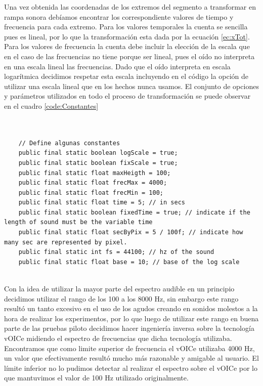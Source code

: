 \documentclass{article}
\begin{document}
    Una vez obtenida las coordenadas de los extremos del segmento a transformar en rampa sonora debíamos encontrar los correspondiente valores de tiempo y frecuencia para cada extremo. Para los valores temporales la cuenta se sencilla pues es lineal, por lo que la transformación esta dada por la ecuación \ref{ec:xTot}. Para los valores de frecuencia la cuenta debe incluir la elección de la escala que en el caso de las frecuencias no tiene porque ser lineal, pues el oído no interpreta en una escala lineal las frecuencias. Dado que el oído interpreta en escala logarítmica decidimos respetar esta escala incluyendo en el código la opción de utilizar una escala lineal que en los hechos nunca usamos. El conjunto de opciones y parámetros utilizados en todo el proceso de transformación se puede observar en el cuadro \ref{code:Constantes}

    \begin{minipage}{\textwidth}
    \begin{lstlisting}[caption=Constantes y parámetros utilizados en el código que crea transforma la información geométrica en el estímulo sonoro., label=code:Constantes]
    
    
    // Define algunas constantes
	public final static boolean logScale = true;
	public final static boolean fixScale = true;
	public final static float maxHeigth = 100;
	public final static float frecMax = 4000;
	public final static float frecMin = 100;
	public final static float time = 5; // in secs
	public final static boolean fixedTime = true; // indicate if the length of sound must be the variable time
	public final static float secByPix = 5 / 100f; // indicate how many sec are represented by pixel.
	public final static int fs = 44100; // hz of the sound
	public final static float base = 10; // base of the log scale
    
    \end{lstlisting}
    \end{minipage}
    
    Con la idea de utilizar la mayor parte del espectro audible en un principio decidimos utilizar el rango de los 100 a los 8000 Hz, sin embargo este rango resultó un tanto excesivo en el uso de los agudos creando en sonidos molestos a la hora de realizar los experimentos, por lo que luego de utilizar este rango en buena parte de las pruebas piloto decidimos hacer ingeniería inversa sobre la tecnología vOICe midiendo el espectro de frecuencias que dicha tecnología utilizaba. Encontramos que como limite superior de frecuencia el vOICe utilizaba 4000 Hz, un valor que efectivamente resultó mucho más razonable y amigable al usuario. El límite inferior no lo pudimos detectar al realizar el espectro sobre el vOICe por lo que mantuvimos el valor de 100 Hz utilizado originalmente. 
    
\end{document}
